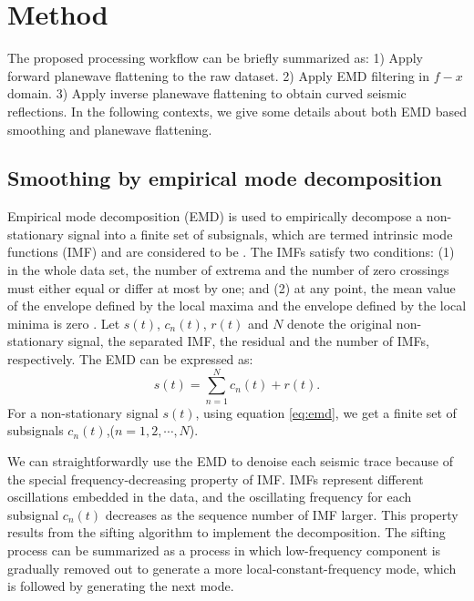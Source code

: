\section{Method}
The proposed processing workflow can be briefly summarized as: 1) Apply forward plane\new{-}wave flattening to the raw dataset. 2) Apply EMD filtering in $f-x$ domain. 3) Apply inverse plane\new{-}wave flattening to obtain curved seismic reflections.
In the following contexts, we  give some details about both EMD based smoothing and plane\new{-}wave flattening.
\subsection{Smoothing by empirical mode decomposition}
Empirical mode decomposition (EMD) is used to empirically decompose a non-stationary signal into a finite set of subsignals, which are termed  intrinsic mode functions (IMF) and are considered to be  . The IMFs satisfy two conditions: (1) in the whole data set, the number of extrema and the number of zero crossings must either equal or differ at most by one; and (2) at any point, the mean value of the envelope defined by the local maxima and the envelope defined by the local minima is zero \cite[]{emd}. 
Let $s(t)$, $c_n(t)$, $r(t)$ and $N$ denote the original non-stationary signal, the separated IMF, the residual and the number of IMFs, respectively. The EMD can be expressed as:
\begin{equation}
\label{eq:emd}
s(t)=\sum_{n=1}^{N}c_n(t)+r(t).
\end{equation}
For a non-stationary signal $s(t)$, using equation \ref{eq:emd}, we get a finite set of subsignals $c_n(t)$,($n=1,2,\cdots,N$). 

We can straightforwardly use the EMD to denoise each seismic trace because of the special frequency-decreasing property of IMF. IMFs represent different oscillations embedded in the data, and the oscillating frequency for each subsignal $c_n(t)$ decreases as the sequence number of IMF  larger. This property results from the sifting algorithm to implement the decomposition. The sifting process can be summarized as a process in which low-frequency component is gradually removed out to generate a more local-constant-frequency mode, which is followed by generating the next mode.

